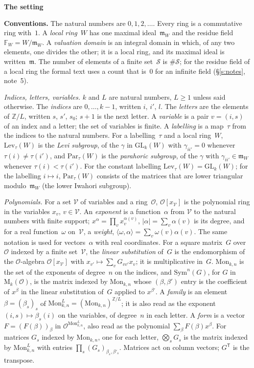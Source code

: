 \documentclass[11pt,a4paper]{article}
\newcommand{\kw}[1]{\emph{#1}}
\newcommand{\m}[1]{\mbox{$#1$}}        %
\newcommand{\sect}[2]{\refstepcounter{section}\label{#2}\par\addvspace{19pt plus 4pt minus 2pt}\Needspace{7\baselineskip}%
  \noindent\llap{{\fontsize{13.2}{16}\selectfont\bfseries\color{inkfaint}\thesection}\hspace{9pt}}%
  {\fontsize{13.2}{16}\selectfont\bfseries\color{ink}#1}\par\nopagebreak\vspace{-1pt}}
\theoremstyle{plainx}
\theoremstyle{uprightx}
\newenvironment{conventions}{\par\addvspace{5pt}\noindent\textbf{Conventions.}\enspace\ignorespaces}{\par\addvspace{3pt}}
\newcommand{\cO}{\mathcal{O}}
\newcommand{\FF}{\mathbb{F}}
\newcommand{\cV}{\mathcal{V}}
\newcommand{\cS}{\mathcal{S}}
\newcommand{\fm}{\mathfrak{m}}
\newcommand{\GLk}{\mathrm{GL}_{k}}
\newcommand{\Mk}{\mathrm{M}_{k}}
\newcommand{\Lev}{\mathrm{Lev}}
\newcommand{\Par}{\mathrm{Par}}
\newcommand{\Mon}{\mathrm{Mon}}
\newcommand{\Fam}{\mathrm{Mon}_{k,n}^{L}}
\newcommand{\ZL}{\mathbb{Z}/L}
\newcommand{\pr}[2]{\langle#1,#2\rangle}
\newcommand{\tp}{\mathsf{T}}
\begin{document}
\sect{The setting}{s:setting}
\begin{conventions}\label{c:conventions}
The natural numbers are \m{0,1,2,\dots}. Every ring is a commutative ring with~$1$. A \kw{local ring}~$W$ has
one maximal ideal~$\fm_W$ and the residue field \m{\FF_W=W/\fm_W}. A \kw{valuation domain} is an integral domain
in which, of any two elements, one divides the other; it is a local ring, and its maximal ideal is written~$\fm$.
The number of elements of a finite set~$\cS$ is \m{\#\cS}; for the residue field of a local ring the formal
text uses a count that is~$0$ for an infinite field (§\ref{s:notes}, note~5).

\emph{Indices, letters, variables.} $k$ and $L$ are natural numbers, \m{L\ge1} unless said otherwise. The
\kw{indices} are \m{0,\dots,k-1}, written $i$, $i'$, $l$. The \kw{letters} are the elements of \m{\ZL}, written
$s$, $s'$, $s_0$; \m{s+1} is the next letter. A \kw{variable} is a pair \m{v=(i,s)} of an index and a letter; the
set of variables is finite. A \kw{labelling} is a map~$\tau$ from the indices to the natural numbers. For a
labelling~$\tau$ and a local ring~$W$, \m{\Lev_{\tau}(W)} is the \kw{Levi subgroup}, of the $\gamma$ in
\m{\GLk(W)} with \m{\gamma_{ii'}=0} whenever \m{\tau(i)\ne\tau(i')}, and \m{\Par_{\tau}(W)} is the \kw{parahoric
subgroup}, of the $\gamma$ with \m{\gamma_{ii'}\in\fm_W} whenever \m{\tau(i)<\tau(i')}. For the constant labelling
\m{\Lev_{\tau}(W)=\GLk(W)}; for the labelling \m{i\mapsto i}, \m{\Par_{\tau}(W)} consists of the matrices that are
lower triangular modulo~$\fm_W$ (the lower Iwahori subgroup).

\emph{Polynomials.} For a set $\cV$ of variables and a ring~$\cO$, \m{\cO[x_{\cV}]} is the polynomial ring in
the variables \m{x_v}, \m{v\in\cV}. An \kw{exponent} is a function~$\alpha$ from $\cV$ to the natural numbers
with finite support; \m{x^{\alpha}=\prod_vx_v^{\alpha(v)}}, \m{|\alpha|=\sum_v\alpha(v)} is its degree, and for a
real function~$\omega$ on~$\cV$, a \kw{weight}, \m{\pr{\omega}{\alpha}=\sum_v\omega(v)\alpha(v)}. The same
notation is used for vectors~$\alpha$ with real coordinates. For a square matrix~$G$ over~$\cO$ indexed by a
finite set~$\cV$, the \kw{linear substitution} of~$G$ is the endomorphism of the $\cO$-algebra \m{\cO[x_{\cV}]}
with \m{x_{v'}\mapsto\sum_vG_{vv'}x_v}; it is multiplicative in~$G$. \m{\Mon_{k,n}} is the set of the exponents of
degree~$n$ on the indices, and \m{\mathrm{Sym}^{n}(G)}, for $G$ in \m{\Mk(\cO)}, is the matrix indexed by
\m{\Mon_{k,n}} whose \m{(\beta,\beta')} entry is the coefficient of \m{x^{\beta}} in the linear substitution of~$G$
applied to \m{x^{\beta'}}. A \kw{family} is an element \m{\beta=(\beta_s)_{s}} of
\m{\Fam=(\Mon_{k,n})^{\ZL}}; it is also read as the exponent \m{(i,s)\mapsto\beta_s(i)} on the variables, of
degree~$n$ in each letter. A \kw{form} is a vector \m{F=(F(\beta))_{\beta}} in \m{\cO^{\Fam}}, also read as the
polynomial \m{\sum_{\beta}F(\beta)x^{\beta}}. For matrices \m{G_s} indexed by \m{\Mon_{k,n}}, one for each letter,
\m{\bigotimes_sG_s} is the matrix indexed by \m{\Fam} with entries \m{\prod_s(G_s)_{\beta_s,\beta'_s}}. Matrices
act on column vectors; \m{G^{\tp}} is the transpose.


\end{conventions}
\end{document}
